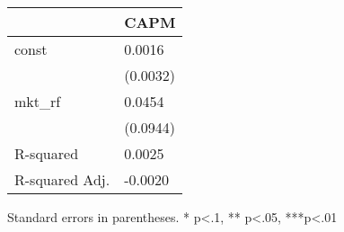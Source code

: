 \begin{table}
\caption{}
\label{}
\begin{center}
\begin{tabular}{ll}
\hline
               & CAPM      \\
\hline
const          & 0.0016    \\
               & (0.0032)  \\
mkt\_rf        & 0.0454    \\
               & (0.0944)  \\
R-squared      & 0.0025    \\
R-squared Adj. & -0.0020   \\
\hline
\end{tabular}
\end{center}
\end{table}
\bigskip
Standard errors in parentheses. \newline 
* p<.1, ** p<.05, ***p<.01